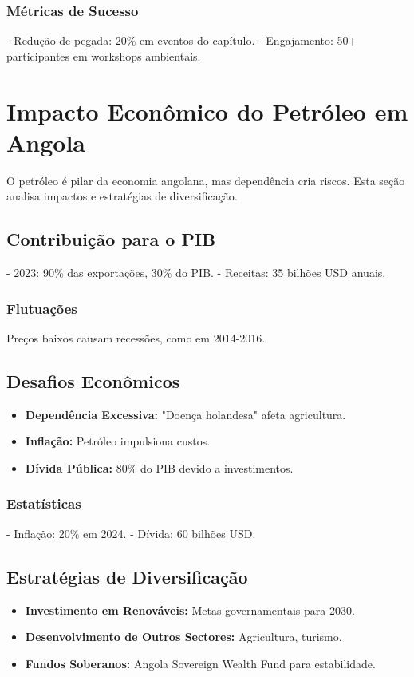 \documentclass[12pt]{article}
\begin{document}
\subsubsection{Métricas de Sucesso}
- Redução de pegada: 20\% em eventos do capítulo.
- Engajamento: 50+ participantes em workshops ambientais.

\section{Impacto Econômico do Petróleo em Angola}

O petróleo é pilar da economia angolana, mas dependência cria riscos. Esta seção analisa impactos e estratégias de diversificação.

\subsection{Contribuição para o PIB}
- 2023: 90\% das exportações, 30\% do PIB.
- Receitas: 35 bilhões USD anuais.

\subsubsection{Flutuações}
Preços baixos causam recessões, como em 2014-2016.

\subsection{Desafios Econômicos}
\begin{itemize}
    \item \textbf{Dependência Excessiva:} "Doença holandesa" afeta agricultura.
    \item \textbf{Inflação:} Petróleo impulsiona custos.
    \item \textbf{Dívida Pública:} 80\% do PIB devido a investimentos.
\end{itemize}

\subsubsection{Estatísticas}
- Inflação: 20\% em 2024.
- Dívida: 60 bilhões USD.

\subsection{Estratégias de Diversificação}
\begin{itemize}
    \item \textbf{Investimento em Renováveis:} Metas governamentais para 2030.
    \item \textbf{Desenvolvimento de Outros Sectores:} Agricultura, turismo.
    \item \textbf{Fundos Soberanos:} Angola Sovereign Wealth Fund para estabilidade.
\end{itemize}
\end{document}
